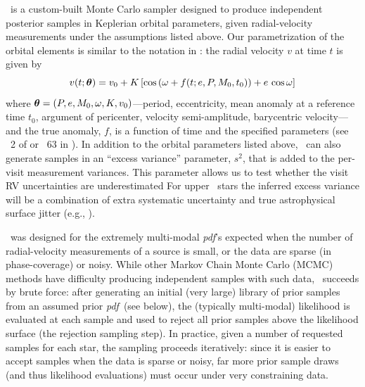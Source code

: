 \documentclass[modern, letterpaper]{aastex62}
\newcommand{\thejoker}{\project{The~Joker}}
\newcommand{\RGB}{\acronym{RGB}}
\newcommand{\pdf}{\textit{pdf}}
\begin{document}
\thejoker\ is a custom-built Monte Carlo sampler designed to produce independent
posterior samples in Keplerian orbital parameters, given radial-velocity
measurements under the assumptions listed above.
Our parametrization of the orbital elements is similar to the notation in
\citet{Murray:2010}:
the radial velocity $v$ at time $t$ is given by
\begin{equation}
  v(t;\bs{\theta}) = v_0 + K\,[\cos\left(\omega + f(t; e, P, M_0, t_0)\right) +
    e\,\cos\omega]
\end{equation}
where $\boldsymbol{\theta} = (P,e,M_0,\omega,K,v_0)$---period, eccentricity, mean
anomaly at a reference time $t_0$, argument of pericenter, velocity
semi-amplitude, barycentric velocity---and the true anomaly, $f$, is a function
of time and the specified parameters (see \sectionname~2 of
\citealt{Price-Whelan:2017} or \eqname~63 in \citealt{Murray:2010}).
In addition to the orbital parameters listed above, \thejoker\ can also generate
samples in an ``excess variance'' parameter, $s^2$, that is added to the
per-visit measurement variances.
This parameter allows us to test whether the visit RV uncertainties are
underestimated
For upper \RGB\ stars the inferred excess variance will be a combination of
extra systematic uncertainty and true astrophysical surface jitter
(e.g., \cite{Hekker:2008}).

\thejoker\ was designed for the extremely multi-modal \pdf 's expected when the
number of radial-velocity measurements of a source is small, or the data are
sparse (in phase-coverage) or noisy.
While other Markov Chain Monte Carlo (MCMC) methods have difficulty producing
independent samples with such data, \thejoker\ succeeds by brute force:
after generating an initial (very large) library of prior samples from an
assumed prior \pdf\ (see below), the (typically multi-modal) likelihood is
evaluated at each sample and used to reject all prior samples above the
likelihood surface (the rejection sampling step).
In practice, given a number of requested samples for each star, the sampling
proceeds iteratively: since it is easier to accept samples when the data is
sparse or noisy, far more prior sample draws (and thus likelihood evaluations)
must occur under very constraining data.

%
%
%
\end{document}
